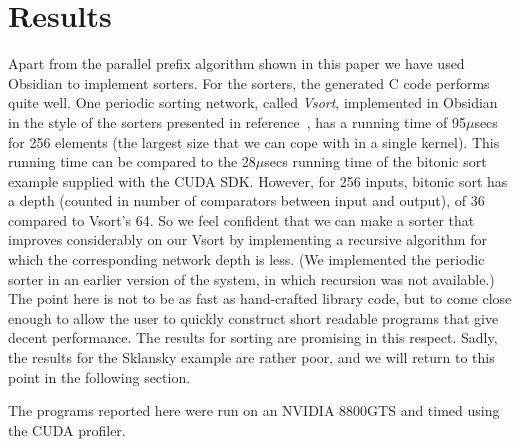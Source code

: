 \section{Results} \label{sec:results}

Apart from the parallel prefix algorithm shown in this paper we have used
Obsidian to implement sorters. For the sorters, the generated C code 
performs quite well. One periodic sorting network, called {\em Vsort}, implemented in Obsidian in the style of the sorters presented in reference~\cite{LavaSorter},
has a running time of 95$\mu$secs for 256 elements (the largest size that we can cope with in a single kernel). This running time can be compared to the 
 28$\mu$secs running time of the bitonic sort example supplied with the CUDA 
SDK. However, for 256 inputs, bitonic sort has a depth (counted in number of comparators between input and output), of 36 compared to 
Vsort's 64. So  we feel confident that we can make a sorter that improves considerably on our Vsort by implementing a recursive algorithm for which the corresponding network depth is less.
(We implemented the periodic sorter in an earlier version of the system, in which recursion was not available.) The point here is not to be as fast as hand-crafted library code, but to come close enough to allow the user to quickly construct short readable programs that give decent performance. The results for sorting are promising in this respect.
Sadly, the results for the Sklansky example are rather poor, and we will return to this point in the following section.



The programs reported here were run on an NVIDIA 8800GTS and timed using 
the CUDA profiler. 


